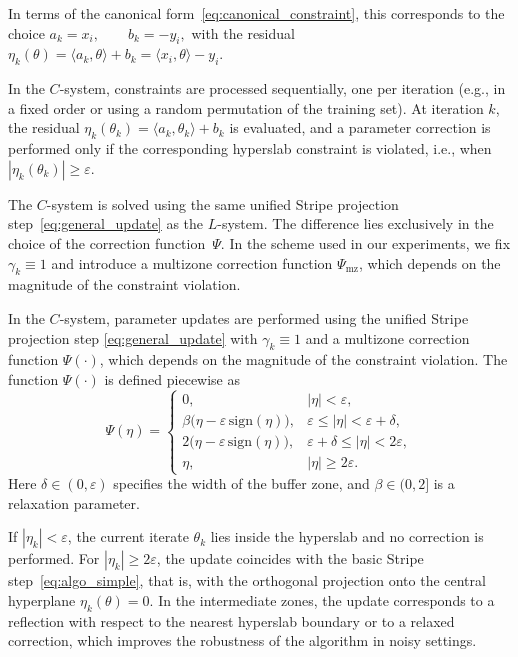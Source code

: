 \documentclass[a4paper,fleqn]{cas-sc}
\begin{document}
In terms of the canonical form~\eqref{eq:canonical_constraint},
this corresponds to the choice
$
a_k = x_i,
\qquad
b_k = -y_i,
$
with the residual
$
\eta_k(\theta)
=
\langle a_k,\theta\rangle + b_k
=
\langle x_i,\theta\rangle - y_i .
$


In the $C$-system, constraints are processed sequentially, one per iteration
(e.g., in a fixed order or using a random permutation of the training set).
At iteration $k$, the residual
$
\eta_k(\theta_k)=\langle a_k,\theta_k\rangle+b_k
$
is evaluated, and a parameter correction is performed only if the corresponding
hyperslab constraint is violated, i.e., when  $|\eta_k(\theta_k)| \ge \varepsilon$.

The $C$-system is solved using the same unified
Stripe projection step~\eqref{eq:general_update}
as the $L$-system.
The difference lies exclusively in the choice of the correction function~$\Psi$.
In the scheme used in our experiments,
we fix $\gamma_k \equiv 1$ and introduce a multizone correction function
$\Psi_{\mathrm{mz}}$,
which depends on the magnitude of the constraint violation.


In the $C$-system, parameter updates are performed using the unified Stripe projection step
\eqref{eq:general_update} with $\gamma_k \equiv 1$
and a multizone correction function $\Psi(\cdot)$,
which depends on the magnitude of the constraint violation.
The function $\Psi(\cdot)$ is defined piecewise as
\[
\Psi(\eta)=
\begin{cases}
0, & |\eta|<\varepsilon, \\[6pt]
\beta\bigl(\eta-\varepsilon\,\mathrm{sign}(\eta)\bigr),
& \varepsilon \le |\eta| < \varepsilon+\delta, \\[10pt]
2\bigl(\eta-\varepsilon\,\mathrm{sign}(\eta)\bigr),
& \varepsilon+\delta \le |\eta| < 2\varepsilon, \\[10pt]
\eta, & |\eta| \ge 2\varepsilon.
\end{cases}
\]
Here $\delta\in(0,\varepsilon)$ specifies the width of the buffer zone,
and $\beta\in(0,2]$ is a relaxation parameter.

If $|\eta_k|<\varepsilon$, the current iterate $\theta_k$ lies inside the hyperslab
and no correction is performed.
For $|\eta_k|\ge 2\varepsilon$, the update coincides with the basic
Stripe step~\eqref{eq:algo_simple},
that is, with the orthogonal projection onto the central hyperplane
$\eta_k(\theta)=0$.
In the intermediate zones, the update corresponds to a reflection
with respect to the nearest hyperslab boundary
or to a relaxed correction,
which improves the robustness of the algorithm in noisy settings.
\end{document}
